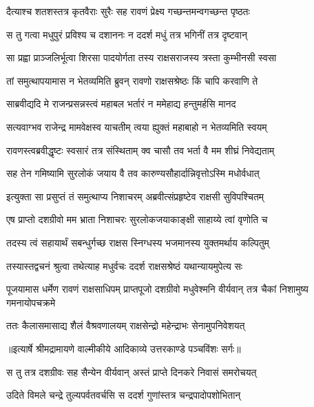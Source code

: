 \twolineshloka
{दैत्याश्च शतशस्तत्र कृतवैराः सुरैः सह}
{रावणं प्रेक्ष्य गच्छन्तमन्वगच्छन्त पृष्ठतः} %

\twolineshloka
{स तु गत्वा मधुपुरं प्रविश्य च दशाननः}
{न ददर्श मधुं तत्र भगिनीं तत्र दृष्टवान्} %

\twolineshloka
{सा प्रह्वा प्राञ्जलिर्भूत्वा शिरसा पादयोर्गता}
{तस्य राक्षसराजस्य त्रस्ता कुम्भीनसी स्वसा} %

\twolineshloka
{तां समुत्थापयामास न भेतव्यमिति ब्रुवन्}
{रावणो राक्षसश्रेष्ठः किं चापि करवाणि ते} %

\twolineshloka
{साब्रवीद्यदि मे राजन्प्रसन्नस्त्वं महाबल}
{भर्तारं न ममेहाद्य हन्तुमर्हसि मानद} %

\twolineshloka
{सत्यवाग्भव राजेन्द्र मामवेक्षस्व याचतीम्}
{त्वया ह्युक्तं महाबाहो न भेतव्यमिति स्वयम्} %

\twolineshloka
{रावणस्त्वब्रवीद्धृष्टः स्वसारं तत्र संस्थिताम्}
{क्व चासौ तव भर्ता वै मम शीघ्रं निवेद्यताम्} %

\twolineshloka
{सह तेन गमिष्यामि सुरलोकं जयाय वै}
{तव कारुण्यसौहार्दान्निवृत्तोऽस्मि मधोर्वधात्} %

\twolineshloka
{इत्युक्ता सा प्रसुप्तं तं समुत्थाप्य निशाचरम्}
{अब्रवीत्संप्रहृष्टेव राक्षसी सुविपश्चितम्} %

\twolineshloka
{एष प्राप्तो दशग्रीवो मम भ्राता निशाचरः}
{सुरलोकजयाकाङ्क्षी साहाय्ये त्वां वृणोति च} %

\twolineshloka
{तदस्य त्वं सहायार्थं सबन्धुर्गच्छ राक्षस}
{स्निग्धस्य भजमानस्य युक्तमर्थाय कल्पितुम्} %

\twolineshloka
{तस्यास्तद्वचनं श्रुत्वा तथेत्याह मधुर्वचः}
{ददर्श राक्षसश्रेष्ठं यथान्यायमुपेत्य सः} %

\threelineshloka
{पूजयामास धर्मेण रावणं राक्षसाधिपम्}
{प्राप्तपूजो दशग्रीवो मधुवेश्मनि वीर्यवान्}
{तत्र चैकां निशामुष्य गमनायोपचक्रमे} %

\twolineshloka
{ततः कैलासमासाद्य शैलं वैश्रवणालयम्}
{राक्षसेन्द्रो महेन्द्राभः सेनामुपनिवेशयत्} %


{॥इत्यार्षे श्रीमद्रामायणे वाल्मीकीये आदिकाव्ये उत्तरकाण्डे पञ्चविंशः सर्गः॥}


\twolineshloka
{स तु तत्र दशग्रीवः सह सैन्येन वीर्यवान्}
{अस्तं प्राप्ते दिनकरे निवासं समरोचयत्} %

\twolineshloka
{उदिते विमले चन्द्रे तुल्यपर्वतवर्चसि}
{स ददर्श गुणांस्तत्र चन्द्रपादोपशोभितान्} %

